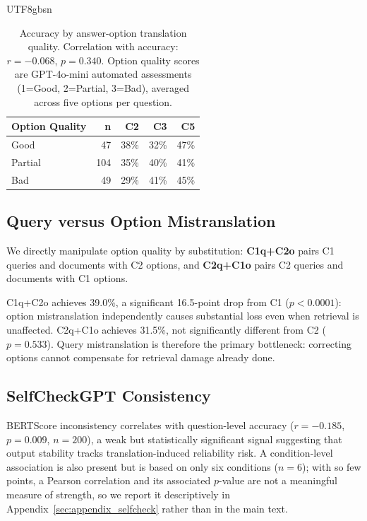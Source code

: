\documentclass[11pt]{article}
\begin{document}
\begin{CJK}{UTF8}{gbsn}
\begin{table}[ht]
\centering
\begin{tabular}{lrrrr}
\toprule
\textbf{Option Quality} & \textbf{n} & \textbf{C2} & \textbf{C3} & \textbf{C5} \\
\midrule
Good & 47 & 38\% & 32\% & 47\% \\
Partial & 104 & 35\% & 40\% & 41\% \\
Bad & 49 & 29\% & 41\% & 45\% \\
\bottomrule
\end{tabular}
\caption{Accuracy by answer-option translation quality. Correlation with accuracy: $r = -0.068$, $p = 0.340$. Option quality scores are GPT-4o-mini automated assessments (1=Good, 2=Partial, 3=Bad), averaged across five options per question.}
\label{tab:option_quality}
\end{table}


\subsection{Query versus Option Mistranslation}
We directly manipulate option quality by substitution: \textbf{C1q+C2o} pairs C1 queries and documents with C2 options, and \textbf{C2q+C1o} pairs C2 queries and documents with C1 options.

C1q+C2o achieves 39.0\%, a significant 16.5-point drop from C1 ($p < 0.0001$): option mistranslation independently causes substantial loss even when retrieval is unaffected. C2q+C1o achieves 31.5\%, not significantly different from C2 ($p = 0.533$). Query mistranslation is therefore the primary bottleneck: correcting options cannot compensate for retrieval damage already done.

\subsection{SelfCheckGPT Consistency}
\label{sec:selfcheck}
BERTScore inconsistency correlates with question-level accuracy ($r = -0.185$, $p = 0.009$, $n = 200$), a weak but statistically significant signal suggesting that output stability tracks translation-induced reliability risk. A condition-level association is also present but is based on only six conditions ($n=6$); with so few points, a Pearson correlation and its associated $p$-value are not a meaningful measure of strength, so we report it descriptively in Appendix~\ref{sec:appendix_selfcheck} rather than in the main text.


\end{CJK}
\end{document}
